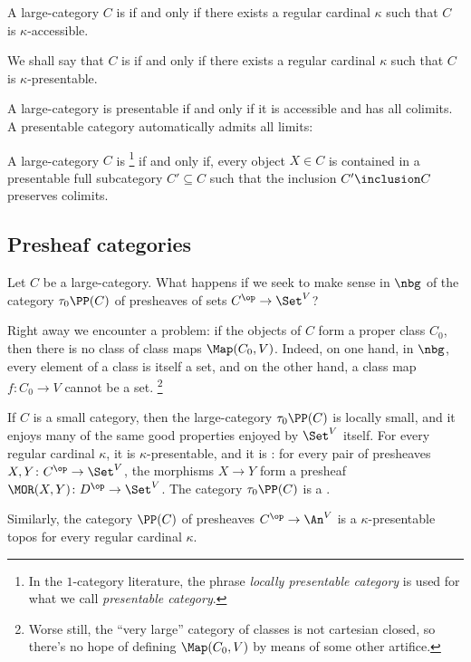 \begin{definition}
	A large-category $ C $ is  if and only if
	there exists a regular cardinal $ \kappa $ such that
	$ C $ is $ \kappa $-accessible.

	We shall say that $ C $ is  if and only if
	there exists a regular cardinal $ \kappa $ such that
	$ C $ is $ \kappa $-presentable.
\end{definition}

\begin{nul}
	A large-category is presentable if and only if
	it is accessible and has all colimits.
	A presentable category automatically admits all limits:
\end{nul}

\begin{definition}
	A large-category $ C $ is %
	\footnote{In the $1$-category literature,
		the phrase \emph{locally presentable category} is used for
		what we call \emph{presentable category}.}
	if and only if, every object $ X \in C $
	is contained in a presentable full subcategory $ C' \subseteq C $
	such that the inclusion $ C' \inclusion C $ preserves colimits.
\end{definition}

\subsection{Presheaf categories}%
\label{sub:presheaf_categories}

Let $ C $ be a large-category.
What happens if we seek to make sense in $ \nbg $
of the category $ \tau_0\PP(C) $ of presheaves of sets
$ C^{\op} \to \Set^V $?

Right away we encounter a problem:
if the objects of $ C $ form a proper class $ C_ 0 $,
then there is no class of class maps $ \Map(C_0, V) $.
Indeed, on one hand, in $ \nbg $, every element of a class is itself a set,
and on the other hand, a class map $ f \colon C_0 \to V $ cannot be a set.%
\footnote{Worse still, the \enquote{very large}
	category of classes is not cartesian closed,
	so there's no hope of defining
	$ \Map(C_0, V) $ by means of some other artifice.}

\begin{nul}
	If $ C $ is a small category, then 
	the large-category $ \tau_0\PP(C) $ is locally small,
	and it enjoys many of the same good properties
	enjoyed by $ \Set^V $ itself.
	For every regular cardinal $ \kappa $,
	it is $ \kappa $-presentable,
	and it is :
	for every pair of presheaves $ X, Y \colon C^{\op} \to \Set^V $,
	the morphisms $ X \to Y $
	form a presheaf $ \MOR(X, Y) \colon D^{\op} \to \Set^V $.
	The category $ \tau_0\PP(C) $ is a .

	Similarly, the category $ \PP(C) $ of presheaves
	$ C^{\op} \to \An^V $
	is a $ \kappa $-presentable topos
	for every regular cardinal $ \kappa $.
\end{nul}

